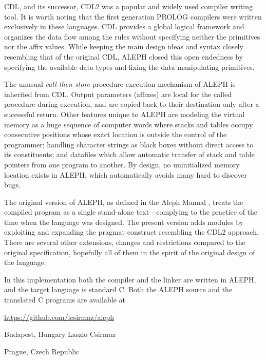 \documentclass[titlepage]{article}
\newcommand\A{\textsf{ALEPH}}
\newcommand\g[1]{\textsf{#1}}
\begin{document}
\g{CDL}, and its successor, \g{CDL2} was a popular and widely used compiler
writing tool. It is worth noting that the first generation \g{PROLOG}
compilers were written exclusively in these languages. \g{CDL} provides a
global logical framework and organizes the data flow among the rules without
specifying neither the primitives nor the affix values. While keeping the
main design ideas and syntax closely resembling that of the original
\g{CDL}, \A{} closed this open endedness by specifying the available
data types and fixing the data manipulating primitives.

The unusual \emph{call-then-store} procedure execution mechanism of \A{} is
inherited from \g{CDL}. Output parameters (affixes) are local for the called
procedure during execution, and are copied back to their destination only
after a successful return. Other features unique to \A{} are modeling the
virtual memory as a huge sequence of computer words where stacks and tables
occupy consecutive positions whose exact location is outside the control of
the programmer; handling character strings as black boxes without direct
access to its constituents; and datafiles which allow automatic transfer of
stack and table pointers from one program to another. By design, no
uninitialized memory location exists in \A, which automatically avoids many
hard to discover bugs.

The original version of \A, as defined in the Aleph Manual \cite{A-manual},
treats the compiled program as a single stand-alone text---complying to the
practice of the time when the language was designed. The present version
adds modules by exploiting and expanding the \g{pragmat} construct
resembling the \g{CDL2} approach. There are several other extensions,
changes and restrictions compared to the original specification, hopefully
all of them in the spirit of the original design of the language.

\smallskip

In this implementation both the compiler and the linker are written in \A,
and the target language is standard {\sf C}. Both the \A{} source and the
translated {\sf C} programs are available at
\begin{center}
\url{https://github.com/lcsirmaz/aleph}
\end{center}

\vskip 20pt

\noindent
Budapest, Hungary \hfill Laszlo Csirmaz

\noindent
Prague, Czech Republic
\end{document}
